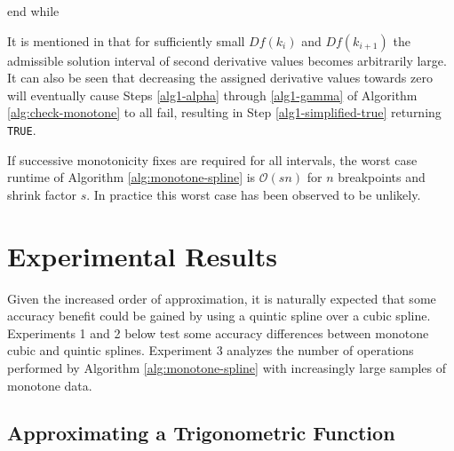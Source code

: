 \documentclass{scspaperproc}
\theoremstyle{scsthe}
\begin{document}
{    \item {}
       \label{step:changed}
    \item {}
       \label{step:requeue}
      end while
}

It is mentioned in  that for sufficiently small $Df(k_i)$ and $Df(k_{i+1})$ the admissible solution interval of second derivative values becomes arbitrarily large. It can also be seen that decreasing the assigned derivative values towards zero will eventually cause Steps \ref{alg1-alpha} through \ref{alg1-gamma} of Algorithm \ref{alg:check-monotone} to all fail, resulting in Step \ref{alg1-simplified-true} returning \texttt{TRUE}.

If successive monotonicity fixes are required for all intervals, the worst case runtime of Algorithm \ref{alg:monotone-spline} is $\mathcal{O}(s n)$ for $n$ breakpoints and shrink factor $s$. In practice this worst case has been observed to be unlikely.

\section{Experimental Results}
\label{sec:results}

Given the increased order of approximation, it is naturally expected that some accuracy benefit could be gained by using a quintic spline over a cubic spline. Experiments 1 and 2 below test some accuracy differences between monotone cubic and quintic splines. Experiment 3 analyzes the number of operations performed by Algorithm \ref{alg:monotone-spline} with increasingly large samples of monotone data.

\subsection{Approximating a Trigonometric Function}
\end{document}
